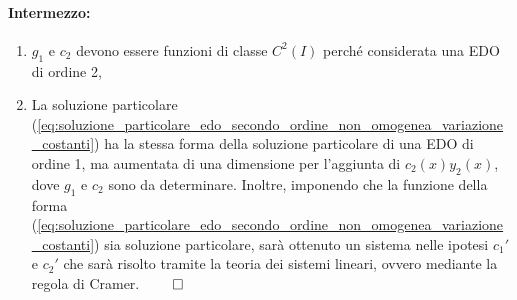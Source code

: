\paragraph{Intermezzo:}
\begin{enumerate}
	\item $g_1$ e $c_2$ devono essere funzioni di classe $C^2(I)$ perché considerata una EDO di ordine 2,
	\item La soluzione particolare (\ref{eq:soluzione_particolare_edo_secondo_ordine_non_omogenea_variazione_costanti}) ha la stessa forma della soluzione particolare di una EDO di ordine 1, ma aumentata di una dimensione per l'aggiunta di $c_2(x) y_2(x)$, dove $g_1$ e $c_2$ sono da determinare. Inoltre, imponendo che la funzione della forma (\ref{eq:soluzione_particolare_edo_secondo_ordine_non_omogenea_variazione_costanti}) sia soluzione particolare, sarà ottenuto un sistema nelle ipotesi $c_1'$ e $c_2'$ che sarà risolto tramite la teoria dei sistemi lineari, ovvero mediante la regola di Cramer. $\qed$
\end{enumerate}


